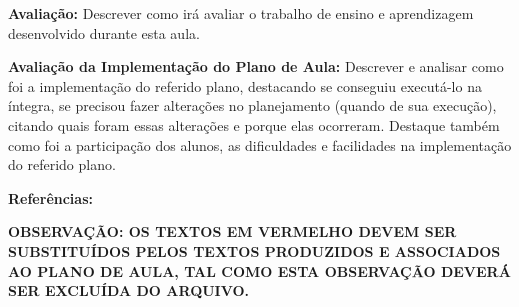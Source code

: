 \documentclass[12pt, a4paper]{article}
\begin{document}
\vspace{0.4cm}

\textbf{Avaliação:} Descrever como irá avaliar o trabalho de ensino e aprendizagem desenvolvido durante esta aula.

\vspace{0.4cm}

\textbf{Avaliação da Implementação do Plano de Aula:} Descrever e analisar como foi a implementação do referido plano, destacando se conseguiu executá-lo na íntegra, se precisou fazer alterações no planejamento (quando de sua execução), citando quais foram essas alterações e porque elas ocorreram. Destaque também como foi a participação dos alunos, as dificuldades e facilidades na implementação do referido plano.

\vspace{0.4cm}

\textbf{Referências:}

\vspace{1cm}

{\color{red}\textbf{OBSERVAÇÃO: OS TEXTOS EM VERMELHO DEVEM SER SUBSTITUÍDOS PELOS TEXTOS PRODUZIDOS E ASSOCIADOS AO PLANO DE AULA, TAL COMO ESTA OBSERVAÇÃO DEVERÁ SER EXCLUÍDA DO ARQUIVO.}}
\end{document}
